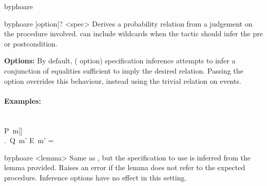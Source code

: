 \begin{tactic}{byphoare}
  \begin{tsyntax}{byphoare [option]? <spec>}
  Derives a probability relation from a \phl judgement on the
  procedure involved.  can include wildcards when the
  tactic should infer the pre or postcondition.

  \textbf{Options:} By default, ( option) specification
  inference attempts to infer a conjunction of equalities sufficient
  to imply the desired relation. Passing the  option
  overrides this behaviour, instead using the trivial relation on
  events.

  \paragraph{Examples:}\strut

  \begin{cmathpar}
    \texample
      {}
      { \\
       P\ m[\Arg\mapsto{}] \\
       \forall {}.\, Q\ m' \Leftrightarrow E\ m'}
      { = \delta}
  \end{cmathpar}
  \end{tsyntax}

  \begin{tsyntax}{byphoare <lemma>}
  Same as , but the specification to use is
  inferred from the lemma provided. Raises an error if the lemma does
  not refer to the expected procedure. Inference options have no
  effect in this setting.
  \end{tsyntax}
\end{tactic}
